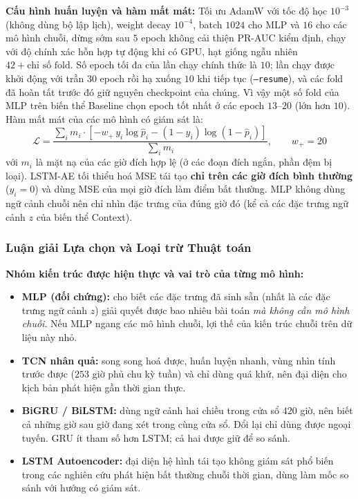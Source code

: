 \noindent\textbf{Cấu hình huấn luyện và hàm mất mát:} Tối ưu AdamW với tốc độ học $10^{-3}$ (không dùng bộ lập lịch), weight decay $10^{-4}$, batch $1024$ cho MLP và $16$ cho các mô hình chuỗi, dừng sớm sau $5$ epoch không cải thiện PR-AUC kiểm định, chạy với độ chính xác hỗn hợp tự động khi có GPU, hạt giống ngẫu nhiên $42 + \text{chỉ số fold}$. Số epoch tối đa của lần chạy chính thức là $10$; lần chạy được khởi động với trần $30$ epoch rồi hạ xuống $10$ khi tiếp tục (\texttt{--resume}), và các fold đã hoàn tất trước đó giữ nguyên checkpoint của chúng. Vì vậy một số fold của MLP trên biến thể Baseline chọn epoch tốt nhất ở các epoch $13$--$20$ (lớn hơn $10$). Hàm mất mát của các mô hình có giám sát là:
\begin{equation*}
    \mathcal{L} = \frac{\sum_i m_i \cdot \left[ -w_{+}\, y_i \log \hat{p}_i - (1 - y_i)\log (1 - \hat{p}_i) \right]}{\sum_i m_i}, \qquad w_{+} = 20
\end{equation*}
với $m_i$ là mặt nạ của các giờ đích hợp lệ (ở các đoạn đích ngắn, phần đệm bị loại). LSTM-AE tối thiểu hoá MSE tái tạo \textbf{chỉ trên các giờ đích bình thường} ($y_i = 0$) và dùng MSE của mọi giờ đích làm điểm bất thường. MLP không dùng ngữ cảnh chuỗi nên chỉ nhìn đặc trưng của đúng giờ đó (kể cả các đặc trưng ngữ cảnh $z$ của biến thể Context).

\subsubsection{Luận giải Lựa chọn và Loại trừ Thuật toán}

\noindent\textbf{Nhóm kiến trúc được hiện thực và vai trò của từng mô hình:}
\begin{itemize}
    \item \textbf{MLP (đối chứng):} cho biết các đặc trưng đã sinh sẵn (nhất là các đặc trưng ngữ cảnh $z$) giải quyết được bao nhiêu bài toán \textit{mà không cần mô hình chuỗi}. Nếu MLP ngang các mô hình chuỗi, lợi thế của kiến trúc chuỗi trên dữ liệu này nhỏ.
    \item \textbf{TCN nhân quả:} song song hoá được, huấn luyện nhanh, vùng nhìn tính trước được ($253$ giờ phủ chu kỳ tuần) và chỉ dùng quá khứ, nên đại diện cho kịch bản phát hiện gần thời gian thực.
    \item \textbf{BiGRU / BiLSTM:} dùng ngữ cảnh hai chiều trong cửa sổ $420$ giờ, nên biết cả những giờ sau giờ đang xét trong cùng cửa sổ. Đổi lại chỉ dùng được ngoại tuyến. GRU ít tham số hơn LSTM; cả hai được giữ để so sánh.
    \item \textbf{LSTM Autoencoder:} đại diện hệ hình tái tạo không giám sát phổ biến trong các nghiên cứu phát hiện bất thường chuỗi thời gian, dùng làm mốc so sánh với hướng có giám sát.
\end{itemize}

